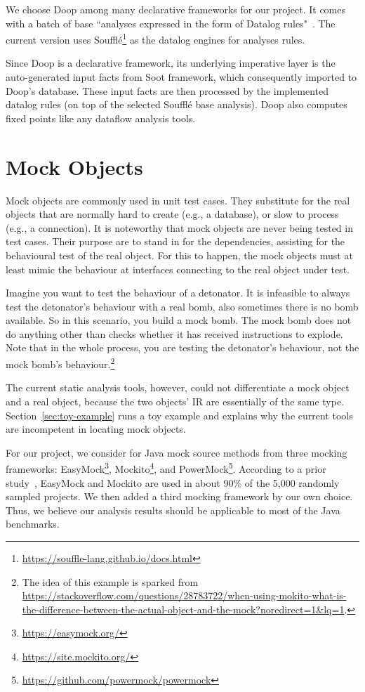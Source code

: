 We choose Doop among many declarative frameworks for our project. It comes with a batch of base ``analyses expressed in the form of Datalog rules"~\cite{doop-repo}. The current version uses Soufflé\footnote{\url{https://souffle-lang.github.io/docs.html}} as the datalog engines for analyses rules.

Since Doop is a declarative framework, its underlying imperative layer is the auto-generated input facts from Soot framework, which consequently imported to Doop's database. These input facts are then processed by the implemented datalog rules (on top of the selected Soufflé base analysis). Doop also computes fixed points like any dataflow analysis tools.


\section{Mock Objects} 

Mock objects are commonly used in unit test cases. They substitute for the real objects that are normally hard to create (e.g., a database), or slow to process (e.g., a connection). It is noteworthy that mock objects are never being tested in test cases. Their purpose are to stand in for the dependencies, assisting for the behavioural test of the real object. For this to happen, the mock objects must at least mimic the behaviour at interfaces connecting to the real object under test.

Imagine you want to test the behaviour of a detonator. It is infeasible to always test the detonator's behaviour with a real bomb, also sometimes there is no bomb available. So in this scenario, you build a mock bomb. The mock bomb does not do anything other than checks whether it has received instructions to explode. Note that in the whole process, you are testing the detonator's behaviour, not the mock bomb's behaviour.\footnote{The idea of this example is sparked from \url{https://stackoverflow.com/questions/28783722/when-using-mokito-what-is-the-difference-between-the-actual-object-and-the-mock?noredirect=1&lq=1}.}

The current static analysis tools, however, could not differentiate a mock object and a real object, because the two objects' IR are essentially of the same type. Section~\ref{sec:toy-example} runs a toy example and explains why the current tools are incompetent in locating mock objects.

For our project, we consider for Java mock source methods from three mocking frameworks: EasyMock\footnote{\url{https://easymock.org/}}, Mockito\footnote{\url{https://site.mockito.org/}}, and PowerMock\footnote{\url{https://github.com/powermock/powermock}}. According to a prior study~\cite{mostafa14:_empirical_study_mock_frameworks}, EasyMock and Mockito are used in about 90\% of the 5,000 randomly sampled projects. We then added a third mocking framework by our own choice. Thus, we believe our analysis results should be applicable to most of the Java benchmarks. 